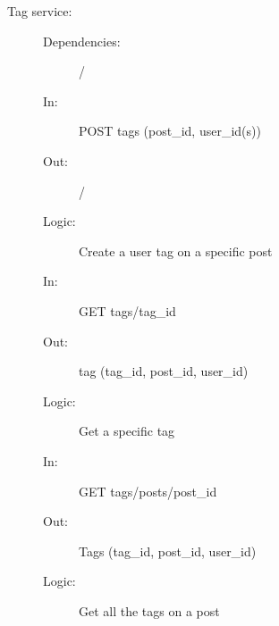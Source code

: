 \documentclass{article}
\begin{document}
\begin{description}
    \item [Tag service:]
    \begin{description}
        \item[]
        \item[Dependencies:] /
    \end{description}
    \begin{description}
        \item[]
        \item[In:] POST tags (post\_id, user\_id(s))
        \item[Out:] /
        \item[Logic:] Create a user tag on a specific post
        \item[]
        
        \item[In:] GET tags/tag\_id
        \item[Out:] tag (tag\_id, post\_id, user\_id)
        \item[Logic:] Get a specific tag
        \item[]

        \item[In:] GET tags/posts/post\_id
        \item[Out:] Tags (tag\_id, post\_id, user\_id)
        \item[Logic:] Get all the tags on a post
        \item[]
    \end{description}
\end{description}
\end{document}

